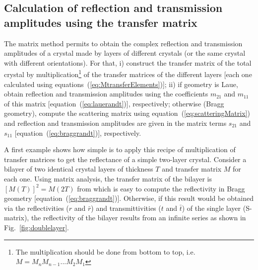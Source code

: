 \documentclass[preprint]{iucr}              %
\begin{document}
\subsection{Calculation of reflection and transmission amplitudes using the transfer matrix}

The matrix method permits to obtain the complex reflection and transmission amplitudes of a crystal made by layers of different crystals (or the same crystal with different orientations). For that,
i) construct the transfer matrix of the total crystal by multiplication\footnote{The multiplication should be done from bottom to top, i.e. $M=M_n M_{n-1}...M_2 M_1$}
of the transfer matrices of the different layers [each one calculated using equations~(\ref{eq:MtransferElements})];
ii) if geometry is Laue, obtain reflection and transmission amplitudes using the coefficients $m_{21}$ and $m_{11}$ of this matrix [equation~(\ref{eq:lauerandt})], respectively; otherwise (Bragg geometry), compute the scattering matrix using equation~(\ref{eq:scatteringMatrix}) and reflection and transmission amplitudes are given in the matrix terms $s_{21}$ and $s_{11}$ [equation~(\ref{eq:braggrandt})], respectively.

A first example shows how simple is to apply this recipe of multiplication of transfer matrices to get the reflectance of a simple two-layer crystal. Consider
a bilayer of two identical crystal layers of thickness $T$ and transfer matrix $M$ for each one. Using matrix analysis, the transfer matrix of the bilayer is $[M(T)]^2=M(2T)$ from which is easy to compute the reflectivity in Bragg geometry [equation~(\ref{eq:braggrandt})]. Otherwise, if this result would be obtained via the reflectivities ($r$ and $\bar{r}$) and transmittivities ($t$ and $\bar{t}$) of the single layer (S-matrix), the reflectivity of the bilayer results from an infinite series as shown in  Fig.~\ref{fig:doublelayer}.
 
\end{document}
